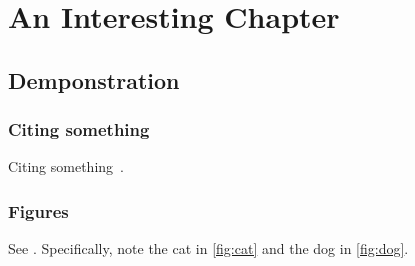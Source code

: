 \chapter{An Interesting Chapter}\label{chap:intro}

  \lipsum{}

  \section{Demponstration}

    \subsection{Citing something}

      Citing something~\cite{darwin1909origin}.

    \subsection{Figures}

      See . Specifically, note the cat in \cref{fig:cat} and the dog in \cref{fig:dog}.

